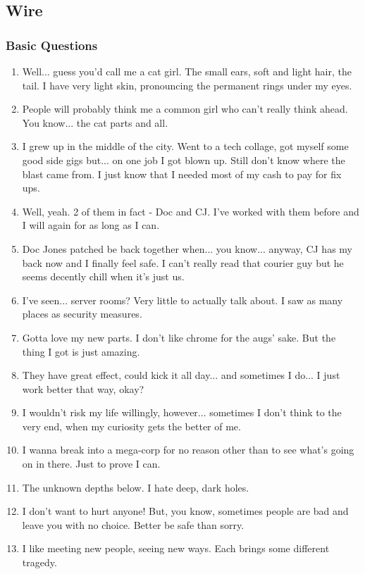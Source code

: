 \def\pfcname{Wire}
\subsection{\pfcname}
\subsubsection{Basic Questions}
\begin{enumerate}
	\setlength\itemsep{-8mm}
	\item Well... guess you'd call me a cat girl. The small ears, soft and light hair, the tail. I have very light skin, pronouncing the permanent rings under my eyes.
	\item People will probably think me a common girl who can't really think ahead. You know... the cat parts and all.
	\item I grew up in the middle of the city. Went to a tech collage, got myself some good side gigs but... on one job I got blown up. Still don't know where the blast came from. I just know that I needed most of my cash to pay for fix ups.
	\item Well, yeah. 2 of them in fact - Doc and CJ. I've worked with them before and I will again for as long as I can.
	\item Doc Jones patched be back together when... you know... anyway, CJ has my back now and I finally feel safe. I can't really read that courier guy but he seems decently chill when it's just us.
	\item I've seen... server rooms? Very little to actually talk about. I saw as many places as security measures.
	\item Gotta love my new parts. I don't like chrome for the augs' sake. But the thing I got is just amazing.
	\item They have great effect, could kick it all day... and sometimes I do... I just work better that way, okay?
	\item I wouldn't risk my life willingly, however... sometimes I don't think to the very end, when my curiosity gets the better of me.
	\item I wanna break into a mega-corp for no reason other than to see what's going on in there. Just to prove I can.
	\item The unknown depths below. I hate deep, dark holes.
	\item I don't want to hurt anyone! But, you know, sometimes people are bad and leave you with no choice. Better be safe than sorry.
	\item I like meeting new people, seeing new ways. Each brings some different tragedy.

\end{enumerate}
